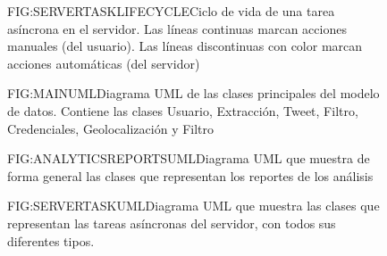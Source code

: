 \begin{figure}[Ciclo de vida de una tarea asíncrona]{FIG:SERVERTASKLIFECYCLE}{Ciclo de vida de una tarea asíncrona en el servidor. Las líneas continuas marcan acciones manuales (del usuario). Las líneas discontinuas con color marcan acciones automáticas (del servidor)}
\end{figure}
\begin{figure}[Diagrama UML Principal]{FIG:MAINUML}{Diagrama UML de las clases principales del modelo de datos. Contiene las clases Usuario, Extracción, Tweet, Filtro, Credenciales, Geolocalización y Filtro}
\end{figure}
\begin{figure}[Diagrama UML Reportes Análisis]{FIG:ANALYTICSREPORTSUML}{Diagrama UML que muestra de forma general las clases que representan los reportes de los análisis}
\end{figure}
\begin{figure}[Diagrama UML Tareas Asíncronas]{FIG:SERVERTASKUML}{Diagrama UML que muestra las clases que representan las tareas asíncronas del servidor, con todos sus diferentes tipos.}
\end{figure}